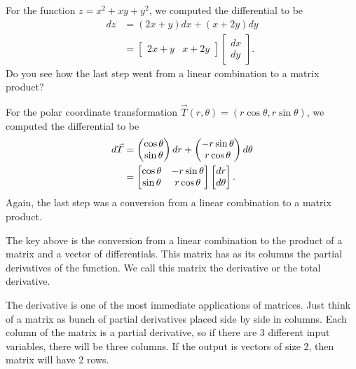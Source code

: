 \begin{example}\label{total derivative example}
For the function $z = x^2+xy+y^2$, we computed the differential to be 
\begin{align*}
 dz &= (2x+y)dx+(x+2y)dy \\
&= \begin{bmatrix}2x+y&x+2y\end{bmatrix}\begin{bmatrix}dx\\dy\end{bmatrix}.
\end{align*}
Do you see how the last step went from a linear combination to a matrix product?


For the polar coordinate transformation $\vec T(r,\theta) = (r\cos\theta,r\sin\theta)$, we computed the differential to be
\begin{align*}
d\vec T &=
\begin{pmatrix}
 \cos\theta\\
 \sin\theta
\end{pmatrix}
dr+ 
\begin{pmatrix}
 -r\sin\theta\\
 r\cos\theta
\end{pmatrix}
d\theta \\
&=
\begin{bmatrix} 
\begin{matrix} 
 \cos\theta\\
 \sin\theta
 \end{matrix}& 
\begin{matrix} 
 -r\sin\theta\\
 r\cos\theta
 \end{matrix}
\end{bmatrix}
\begin{bmatrix}
 dr\\
 d\theta
\end{bmatrix}.
\end{align*}
Again, the last step was a conversion from a linear combination to a matrix product. 

\end{example}


The key above is the conversion from a linear combination to the product of a matrix and a vector of differentials. This matrix has as its columns the partial derivatives of the function.
We call this matrix the derivative or the total derivative. 

The derivative is one of the most immediate applications of matrices. Just think of a matrix as bunch of partial derivatives placed side by side in columns. Each column of the matrix is a partial derivative, so if there are 3 different input variables, there will be three columns. If the output is vectors of size 2, then matrix will have 2 rows. 

